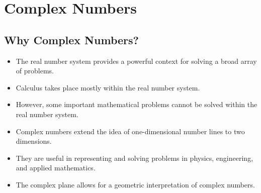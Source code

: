 \section{Complex Numbers}
\subsection{Why Complex Numbers?}
\begin{itemize}
    \item The real number system provides a powerful context for solving a broad array of problems.
    \item Calculus takes place mostly within the real number system.
    \item However, some important mathematical problems cannot be solved within the real number system.
    \item Complex numbers extend the idea of one-dimensional number lines to two dimensions.
    \item They are useful in representing and solving problems in physics, engineering, and applied mathematics.
    \item The complex plane allows for a geometric interpretation of complex numbers.
\end{itemize}

